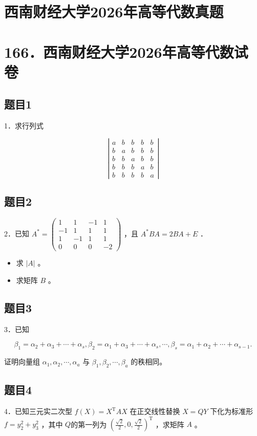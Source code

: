 \documentclass{article}
\begin{document}
\section*{西南财经大学2026年高等代数真题}
\section*{166．西南财经大学2026年高等代数试卷}

\subsection{题目1}
1．求行列式

\[
\left|\begin{array}{ccccc}
a & b & b & b & b \\
b & a & b & b & b \\
b & b & a & b & b \\
b & b & b & a & b \\
b & b & b & b & a
\end{array}\right|
\]

\subsection{题目2}
2．已知 \(A^{*}=\left(\begin{array}{cccc}1 & 1 & -1 & 1 \\ -1 & 1 & 1 & 1 \\ 1 & -1 & 1 & 1 \\ 0 & 0 & 0 & -2\end{array}\right)\) ，且 \(A^{*} B A=2 B A+E\) ．

\begin{itemize}
  \item[（1）] 求 \(|A|\) 。
  \item[（2）] 求矩阵 \(B\) 。
\end{itemize}

\subsection{题目3}
3．已知

\[
\beta_{1}=\alpha_{2}+\alpha_{3}+\cdots+\alpha_{s}, \beta_{2}=\alpha_{1}+\alpha_{3}+\cdots+\alpha_{s}, \cdots, \beta_{s}=\alpha_{1}+\alpha_{2}+\cdots+\alpha_{s-1} .
\]

证明向量组 \(\alpha_{1}, \alpha_{2}, \cdots, \alpha_{a}\) 与 \(\beta_{1}, \beta_{2}, \cdots, \beta_{a}\) 的秩相同。

\subsection{题目4}
4．已知三元实二次型 \(f(X)=X^{\mathrm{T}} A X\) 在正交线性替换 \(X=Q Y\) 下化为标准形 \(f=y_{2}^{2}+y_{3}^{2}\) ，其中 \(Q\)的第一列为 \(\left(\frac{\sqrt{2}}{2}, 0, \frac{\sqrt{2}}{2}\right)^{\mathrm{T}}\) ，求矩阵 \(A\) 。
\end{document}
